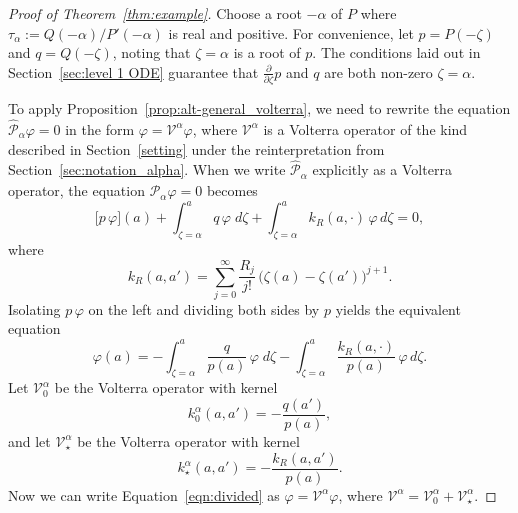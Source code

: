 \documentclass{article}
\theoremstyle{plain}
\newcommand{\volterra}{\mathcal{V}}
\newcommand{\hardpart}{\mathcal{V}_0}
\newcommand{\softpart}{\mathcal{V}_\star}
\newcommand{\hardker}{k_0}
\newcommand{\softker}{k_\star}
\begin{document}
\begin{proof}[Proof of Theorem~\ref{thm:example}]
Choose a root $-\alpha$ of $P$ where $\tau_\alpha := Q(-\alpha)/P'(-\alpha)$ is real and positive. For convenience, let $p = P(-\zeta)$ and $q = Q(-\zeta)$, noting that $\zeta = \alpha$ is a root of $p$. The conditions laid out in Section~\ref{sec:level 1 ODE} guarantee that $\frac{\partial}{\partial \zeta} p$ and $q$ are both non-zero $\zeta = \alpha$.

To apply Proposition~\ref{prop:alt-general_volterra}, we need to rewrite the equation $\hat{\mathcal{P}}_{\alpha}\varphi = 0$ in the form $\varphi = \volterra^\alpha \varphi$, where $\volterra^\alpha$ is a Volterra operator of the kind described in Section~\ref{setting} under the reinterpretation from Section~\ref{sec:notation_alpha}. When we write $\hat{\mathcal{P}}_\alpha$ explicitly as a Volterra operator, the equation $\hat{\mathcal{P}}_{\alpha} \varphi = 0$ becomes
\[ \big[ p\, \varphi \big](a) + \int_{\zeta=\alpha}^a q \, \varphi \; d\zeta + \int_{\zeta=\alpha}^a k_R(a,\cdot) \, \varphi \, d\zeta = 0, \]
where
\[ k_R(a,a')=\sum_{j=0}^\infty \frac{R_{j}}{j!} \, \big(\zeta(a)-\zeta(a')\big)^{j+1} . \]
Isolating $p\,\varphi$ on the left and dividing both sides by $p$ yields the equivalent equation
\begin{equation}\label{eqn:divided}
\varphi(a) = -\int_{\zeta=\alpha}^a \frac{q}{p(a)} \, \varphi \; d\zeta - \int_{\zeta=\alpha}^a \frac{k_R(a,\cdot)}{p(a)} \, \varphi \, d\zeta.
\end{equation}
Let $\hardpart^\alpha$ be the Volterra operator with kernel
\[ \hardker^\alpha(a,a') = -\frac{q(a')}{p(a)}, \]
and let $\softpart^\alpha$ be the Volterra operator with kernel
\[ \softker^\alpha(a,a') = -\frac{k_R(a,a')}{p(a)}. \]
Now we can write Equation~\eqref{eqn:divided} as $\varphi = \volterra^\alpha \varphi$, where $\volterra^\alpha = \hardpart^\alpha + \softpart^\alpha$.


\end{proof}
\end{document}
